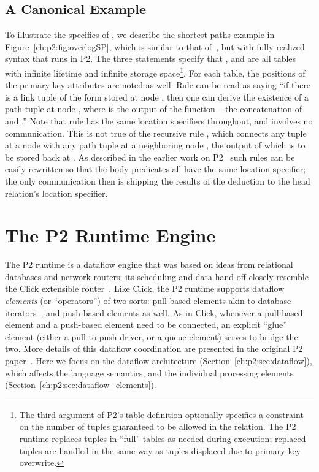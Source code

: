 \subsection{A Canonical Example}
\label{ch:p2:sec:declnet}

To illustrate the specifics of \OVERLOG, we describe the shortest paths example
in Figure~\ref{ch:p2:fig:overlogSP}, which is similar to that
of~\cite{loo-sigmod06}, but with fully-realized \OVERLOG syntax that runs in
P2.  The three  statements specify that , 
and  are all tables with infinite lifetime and infinite storage
space\footnote{The third argument of P2's table definition optionally specifies
a constraint on the number of tuples guaranteed to be allowed in the relation.
The P2 runtime replaces tuples in ``full'' tables as needed during execution;
replaced tuples are handled in the same way as tuples displaced due to
primary-key overwrite.}.  For each table, the positions of the primary key
attributes are noted as well.  Rule  can be read as saying ``if there is
a link tuple of the form  stored at node , then one can
derive the existence of a path tuple  at node , where
 is the output of the function  -- the concatenation of
 and .'' Note that rule  has the same location specifiers
throughout, and involves no communication.  This is not true of the recursive
rule , which connects any  tuple at a node  with any path
tuple at a neighboring node , the output of which is to be stored back at
.  As described in the earlier work on
P2~\cite{loo-sigcomm05,loo-sigmod06} such rules can be easily rewritten so that
the body predicates all have the same location specifier; the only
communication then is shipping the results of the deduction to the head
relation's location specifier.

\section{The P2 Runtime Engine}
\label{ch:p2:sec:p2}

The P2 runtime is a dataflow engine that was based on ideas from relational
databases and network routers; its scheduling and data hand-off closely
resemble the Click extensible router~\cite{click-tocs}.  Like Click, the P2
runtime supports dataflow {\em elements} (or ``operators'') of two sorts:
pull-based elements akin to database iterators~\cite{graefe-survey}, and
push-based elements as well.  As in Click, whenever a pull-based element and a
push-based element need to be connected, an explicit ``glue'' element (either a
pull-to-push driver, or a queue element) serves to bridge the two.  More
details of this dataflow coordination are presented in the original P2
paper~\cite{p2:sosp}.  Here we focus on the dataflow architecture
(Section~\ref{ch:p2:sec:dataflow}), which affects the language semantics, and
the individual processing elements (Section~\ref{ch:p2:sec:dataflow_elements}).

